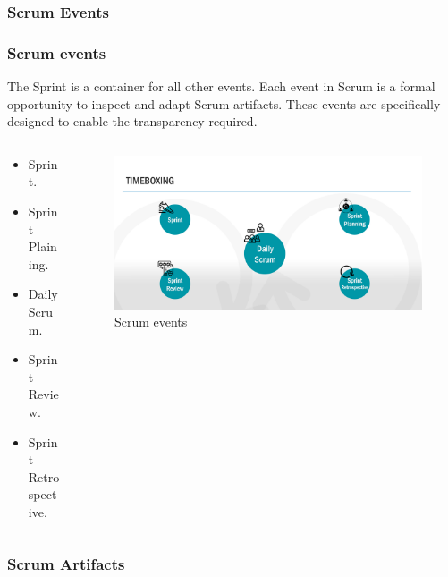 \documentclass[
	11pt, %
]{beamer}
\begin{document}
\subsubsection{Scrum Events}
\begin{frame}
	\frametitle{Scrum events}
	The Sprint is a container for all other
	events. Each event in Scrum is a formal
	opportunity to inspect and adapt Scrum
	artifacts. These events are specifically
	designed to enable the transparency required.
	\begin{columns}[c] %
		\begin{column}{0.4\textwidth} %
			\begin{itemize} %
				\item Sprint.
				\item Sprint Plaining.
				\item Daily Scrum.
				\item Sprint Review.
				\item Sprint Retrospective.
			\end{itemize}
		\end{column}
		\begin{column}{0.7\textwidth} %
			\begin{figure}
				\includegraphics[width=1\linewidth]{events.png}
				\caption{Scrum events}
			\end{figure}
		\end{column}
	\end{columns}
\end{frame}

\subsubsection{Scrum Artifacts}
\end{document}
